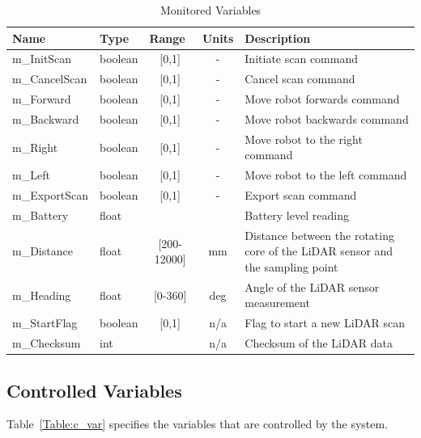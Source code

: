 \documentclass[12pt, titlepage]{article}
\begin{document}
\begin{table}[H]
\caption{Monitored Variables}
\label{Table:m_var}
\begin{tabularx}{\textwidth}{|l|l|c|c|X|}
\hline{\bf Name} & {\bf Type} & \multicolumn{1}{l|}{\bf Range} & \multicolumn{1}{l|}{\bf Units}& {\bf Description}\\
\hline
 m\_InitScan & boolean & [0,1] & - & Initiate scan command\\
\hline
 m\_CancelScan & boolean & [0,1] & - & Cancel scan command\\
\hline
m\_Forward & boolean & [0,1] & - & Move robot forwards command\\
\hline
m\_Backward & boolean & [0,1] & - & Move robot backwards command\\
\hline
m\_Right & boolean & [0,1] & - & Move robot to the right command\\
\hline
m\_Left & boolean & [0,1] & - & Move robot to the left command\\
\hline
m\_ExportScan & boolean & [0,1] & - & Export scan command\\
\hline
m\_Battery & float &  &  & Battery level reading\\
\hline
m\_Distance & float & [200-12000] & mm & Distance between the rotating core of the LiDAR sensor and the sampling point\\
\hline
m\_Heading & float & [0-360] & deg & Angle of the LiDAR sensor measurement\\
\hline
m\_StartFlag & boolean & [0,1] & n/a & Flag to start a new LiDAR scan\\
\hline
m\_Checksum & int &  & n/a & Checksum of the LiDAR data\\
\hline
\end{tabularx}
\label{Table:m_var}
\end{table}

\subsection{Controlled Variables}

Table~\ref{Table:c_var} specifies the variables that are controlled by the system.
\end{document}
